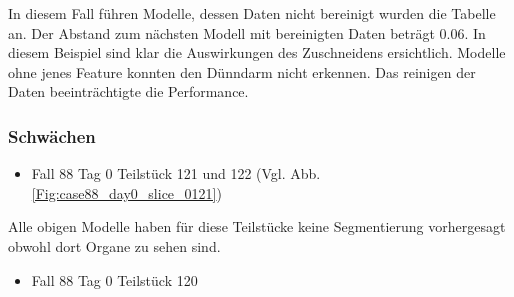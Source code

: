\begin{table}[H]
\centering
{}
\caption{Siehe Abb. \ref{Fig:case18_day19_slice_0079}}\label{tab:intresting}
\end{table}

In diesem Fall führen Modelle, dessen Daten nicht bereinigt wurden die Tabelle an. Der Abstand zum nächsten Modell mit bereinigten Daten beträgt 0.06. In diesem Beispiel sind klar die Auswirkungen des Zuschneidens ersichtlich. Modelle ohne jenes Feature konnten den Dünndarm nicht erkennen. Das reinigen der Daten beeinträchtigte die Performance.

\pagebreak

\subsubsection{Schwächen}

\begin{itemize}
\item  Fall 88 Tag 0 Teilstück 121 und 122 (Vgl. Abb. \ref{Fig:case88_day0_slice_0121})
\end{itemize}

Alle obigen Modelle haben für diese Teilstücke keine Segmentierung vorhergesagt obwohl dort Organe zu sehen sind.

\begin{itemize}
\item  Fall 88 Tag 0 Teilstück 120
\end{itemize}

